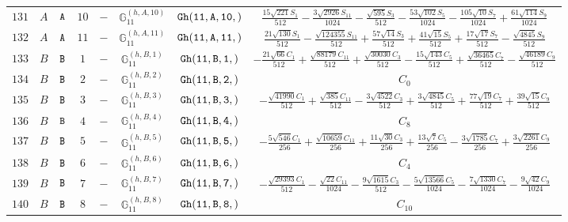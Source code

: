 \documentclass[fleqn,8pt]{jsarticle}
\begin{document}
\begin{table}[ht!]
\begin{center}
\begin{tabular}{cccccccc}
$ 131 $ & $ A $ & $ {\tt A} $ & $ 10 $ & $ - $ & $ \mathbb{G}_{11}^{(h,A,10)} $ & $ {\tt Gh(11,A,10,)} $ & $ \frac{15 \sqrt{221} S_{1}}{512} - \frac{3 \sqrt{2926} S_{11}}{1024} - \frac{\sqrt{595} S_{3}}{512} - \frac{53 \sqrt{102} S_{5}}{1024} - \frac{105 \sqrt{10} S_{7}}{1024} + \frac{61 \sqrt{114} S_{9}}{1024} $ \\
$ 132 $ & $ A $ & $ {\tt A} $ & $ 11 $ & $ - $ & $ \mathbb{G}_{11}^{(h,A,11)} $ & $ {\tt Gh(11,A,11,)} $ & $ \frac{21 \sqrt{130} S_{1}}{512} - \frac{\sqrt{124355} S_{11}}{512} + \frac{57 \sqrt{14} S_{3}}{512} + \frac{41 \sqrt{15} S_{5}}{512} + \frac{17 \sqrt{17} S_{7}}{512} - \frac{\sqrt{4845} S_{9}}{512} $ \\
$ 133 $ & $ B $ & $ {\tt B} $ & $ 1 $ & $ - $ & $ \mathbb{G}_{11}^{(h,B,1)} $ & $ {\tt Gh(11,B,1,)} $ & $ - \frac{21 \sqrt{66} C_{1}}{512} + \frac{\sqrt{88179} C_{11}}{512} + \frac{\sqrt{30030} C_{3}}{512} - \frac{15 \sqrt{143} C_{5}}{512} + \frac{\sqrt{36465} C_{7}}{512} - \frac{\sqrt{46189} C_{9}}{512} $ \\
$ 134 $ & $ B $ & $ {\tt B} $ & $ 2 $ & $ - $ & $ \mathbb{G}_{11}^{(h,B,2)} $ & $ {\tt Gh(11,B,2,)} $ & $ C_{0} $ \\
$ 135 $ & $ B $ & $ {\tt B} $ & $ 3 $ & $ - $ & $ \mathbb{G}_{11}^{(h,B,3)} $ & $ {\tt Gh(11,B,3,)} $ & $ - \frac{\sqrt{41990} C_{1}}{512} + \frac{\sqrt{385} C_{11}}{512} - \frac{3 \sqrt{4522} C_{3}}{512} + \frac{3 \sqrt{4845} C_{5}}{512} + \frac{77 \sqrt{19} C_{7}}{512} + \frac{39 \sqrt{15} C_{9}}{512} $ \\
$ 136 $ & $ B $ & $ {\tt B} $ & $ 4 $ & $ - $ & $ \mathbb{G}_{11}^{(h,B,4)} $ & $ {\tt Gh(11,B,4,)} $ & $ C_{8} $ \\
$ 137 $ & $ B $ & $ {\tt B} $ & $ 5 $ & $ - $ & $ \mathbb{G}_{11}^{(h,B,5)} $ & $ {\tt Gh(11,B,5,)} $ & $ - \frac{5 \sqrt{546} C_{1}}{256} + \frac{\sqrt{10659} C_{11}}{256} + \frac{11 \sqrt{30} C_{3}}{256} + \frac{13 \sqrt{7} C_{5}}{256} - \frac{3 \sqrt{1785} C_{7}}{256} + \frac{3 \sqrt{2261} C_{9}}{256} $ \\
$ 138 $ & $ B $ & $ {\tt B} $ & $ 6 $ & $ - $ & $ \mathbb{G}_{11}^{(h,B,6)} $ & $ {\tt Gh(11,B,6,)} $ & $ C_{4} $ \\
$ 139 $ & $ B $ & $ {\tt B} $ & $ 7 $ & $ - $ & $ \mathbb{G}_{11}^{(h,B,7)} $ & $ {\tt Gh(11,B,7,)} $ & $ - \frac{\sqrt{29393} C_{1}}{512} - \frac{\sqrt{22} C_{11}}{1024} - \frac{9 \sqrt{1615} C_{3}}{512} - \frac{5 \sqrt{13566} C_{5}}{1024} - \frac{7 \sqrt{1330} C_{7}}{1024} - \frac{9 \sqrt{42} C_{9}}{1024} $ \\
$ 140 $ & $ B $ & $ {\tt B} $ & $ 8 $ & $ - $ & $ \mathbb{G}_{11}^{(h,B,8)} $ & $ {\tt Gh(11,B,8,)} $ & $ C_{10} $ \\

\end{tabular}
\end{center}
\end{table}
\end{document}
